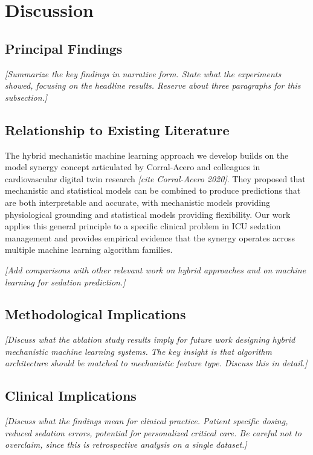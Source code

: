 \documentclass[11pt,a4paper]{article}
\newcommand{\placeholder}[1]{\textcolor{placeholdergray}{\textit{[#1]}}}
\begin{document}
\section{Discussion}

\subsection{Principal Findings}

\placeholder{Summarize the key findings in narrative form. State what
the experiments showed, focusing on the headline results. Reserve
about three paragraphs for this subsection.}

\subsection{Relationship to Existing Literature}

The hybrid mechanistic machine learning approach we develop builds
on the model synergy concept articulated by Corral-Acero and colleagues
in cardiovascular digital twin research \placeholder{cite Corral-Acero
2020}. They proposed that mechanistic and statistical models can be
combined to produce predictions that are both interpretable and
accurate, with mechanistic models providing physiological grounding
and statistical models providing flexibility. Our work applies this
general principle to a specific clinical problem in ICU sedation
management and provides empirical evidence that the synergy operates
across multiple machine learning algorithm families.

\placeholder{Add comparisons with other relevant work on hybrid
approaches and on machine learning for sedation prediction.}

\subsection{Methodological Implications}

\placeholder{Discuss what the ablation study results imply for future
work designing hybrid mechanistic machine learning systems. The key
insight is that algorithm architecture should be matched to mechanistic
feature type. Discuss this in detail.}

\subsection{Clinical Implications}

\placeholder{Discuss what the findings mean for clinical practice.
Patient specific dosing, reduced sedation errors, potential for
personalized critical care. Be careful not to overclaim, since this
is retrospective analysis on a single dataset.}
\end{document}

